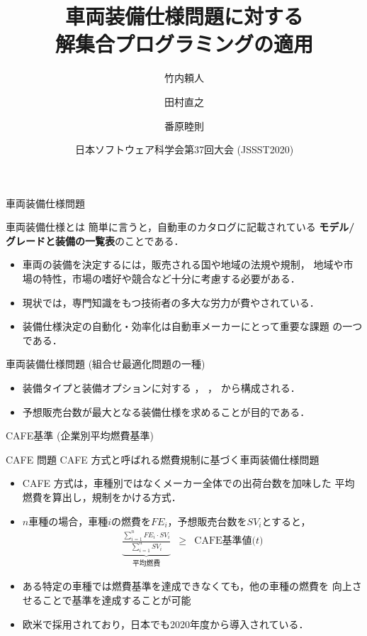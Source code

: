 \documentclass[dvipdfmx, 11pt]{beamer}
\title{車両装備仕様問題に対する\\解集合プログラミングの適用}
\author{竹内頼人\inst{1} \and 田村直之\inst{2} \and 番原睦則\inst{1}}
\institute{\inst{1}名古屋大学 大学院情報学研究科 \and \inst{2}神戸大学 情報基盤センター}
\date{日本ソフトウェア科学会第37回大会 (JSSST2020)}
\begin{document}
\frame{\titlepage}
\begin{frame}{車両装備仕様問題}
  \begin{alertblock}{車両装備仕様とは}
    簡単に言うと，自動車のカタログに記載されている
    \textbf{モデル/グレードと装備の一覧表}のことである．
  \end{alertblock}

  \begin{itemize}
  \item 車両の装備を決定するには，販売される国や地域の法規や規制，
    地域や市場の特性，市場の嗜好や競合など十分に考慮する必要がある．
  \item 現状では，専門知識をもつ技術者の多大な労力が費やされている．
  \item 装備仕様決定の自動化・効率化は自動車メーカーにとって重要な課題
    の一つである．
  \end{itemize}

  \begin{block}{車両装備仕様問題 (組合せ最適化問題の一種)}
    \begin{itemize}
    \item 装備タイプと装備オプションに対する
      ，
      ，
      から構成される．
    \item 予想販売台数が最大となる装備仕様を求めることが目的である．
    \end{itemize}
  \end{block}
\end{frame}
\begin{frame}{CAFE基準 (企業別平均燃費基準)}
  \begin{alertblock}{CAFE 問題}\centering
    CAFE 方式と呼ばれる燃費規制に基づく車両装備仕様問題
  \end{alertblock}

  \begin{itemize}
  \item CAFE 方式は，車種別ではなくメーカー全体での出荷台数を加味した
    平均燃費を算出し，規制をかける方式．
  \item $n$車種の場合，車種$i$の燃費を$FE_i$，予想販売台数を$SV_i$とすると，
    \[
      \begin{array}{lcr}
        \underbrace{
        \frac{\sum_{i=1}^{n} FE_{i}\cdot SV_{i}}
        {\sum_{i=1}^{n} SV_{i}}}_{\textrm{平均燃費}
        }
        &
        \geq 
        &
        \textrm{CAFE基準値($t$)}
      \end{array}
    \]
  \item ある特定の車種では燃費基準を達成できなくても，他の車種の燃費を
    向上させることで基準を達成することが可能
  \item 欧米で採用されており，日本でも2020年度から導入されている．
  \end{itemize}
\end{frame}
\end{document}
